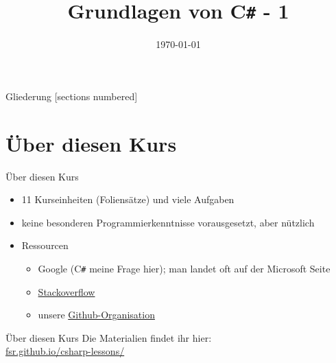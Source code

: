 



\title{Grundlagen von C\texttt{\#} - 1}
\date{\today}




\maketitle

\begin{frame}{Gliederung}
	[sections numbered]
	\tableofcontents
\end{frame}

\section{Über diesen Kurs}
\begin{frame}{Über diesen Kurs}
	\begin{itemize}
		\item 11 Kurseinheiten (Foliensätze) und viele Aufgaben
		\item keine besonderen Programmierkenntnisse vorausgesetzt, aber nützlich
		\item Ressourcen
		\begin{itemize}
			\item Google (C\texttt{\#} meine Frage hier); man landet oft auf der Microsoft Seite
			\item \href{http://stackoverflow.com/}{\alert{Stackoverflow}}
			\item unsere \href{https://github.com/fsr}{\alert{Github-Organisation}}
		\end{itemize}
	\end{itemize}
\end{frame}

\begin{frame}{Über diesen Kurs}
	\centering \normalsize Die Materialien findet ihr hier: \\
	\huge \alert{\href{https://fsr.github.io/csharp-lessons/}{fsr.github.io/csharp-lessons/}}\\	
\end{frame}

